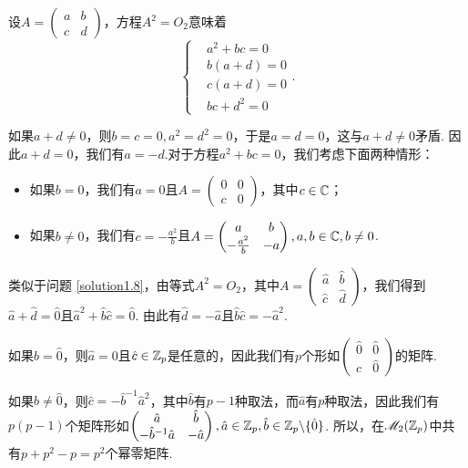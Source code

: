\setcounter{solution}{7}
\begin{solution}
  设$A=\begin{pmatrix}
    a & b \\
    c & d
  \end{pmatrix}$，方程$A^2=O_2$意味着
  \[
    \left\{
      \begin{aligned}
        & a^2 + bc = 0 \\
        & b(a+d) = 0 \\
        & c(a+d) = 0 \\
        & bc + d^2 = 0
      \end{aligned}
    \right..
  \]

  如果$a+d\ne0$，则$b=c=0,a^2=d^2=0$，于是$a=d=0$，这与$a+d\ne0$矛盾. 因此$a+d=0$，我们有$a=-d$.对于方程$a^2+bc=0$，我们考虑下面两种情形：
  \begin{itemize}
    \item 如果$b=0$，我们有$a=0$且$A=\begin{pmatrix}
      0 & 0 \\
      c & 0
    \end{pmatrix}$，其中$c\in\mathbb C$；
    \item 如果$b\ne0$，我们有$c=-\frac{a^2}b$且$A=\begin{pmatrix}
          a & b \\
          -\frac{a^2}b & -a
        \end{pmatrix},a,b\in\mathbb C,b\ne0$.
  \end{itemize}
\end{solution}

\setcounter{solution}{9}
\begin{solution}
  类似于问题 \ref{solution1.8}，由等式$A^2=O_2$，其中$A=\begin{pmatrix}
    \hat a & \hat b \\
    \hat c & \hat d
  \end{pmatrix}$，我们得到$\hat a+\hat d=\hat 0$且$\hat a^2+\hat b\hat c=\hat 0$. 由此有$\hat d=-\hat a$且$\hat b\hat c=-\hat a^2$.

  如果$\hat b=\hat0$，则$\hat a= 0$且$\hat c\in\mathbb Z_p$是任意的，因此我们有$p$个形如$\begin{pmatrix}
    \hat 0 & \hat 0 \\
    \hat c & \hat 0
  \end{pmatrix}$的矩阵.

  如果$\hat b\ne\hat 0$，则$\hat c= -\hat b^{-1}\hat a^2$，其中$\hat b$有$p-1$种取法，而$\hat a$有$p$种取法，因此我们有$p(p-1)$个矩阵形如$\begin{pmatrix}
    \hat a & \hat b \\
    -\hat b^{-1}\hat a & -\hat a
  \end{pmatrix},\hat a\in\mathbb Z_p,\hat b\in\mathbb Z_p\backslash\{\hat 0\}$. 所以，在$\mathscr M_2(\mathbb Z_p)$中共有$p+p^2-p=p^2$个幂零矩阵.
\end{solution}

